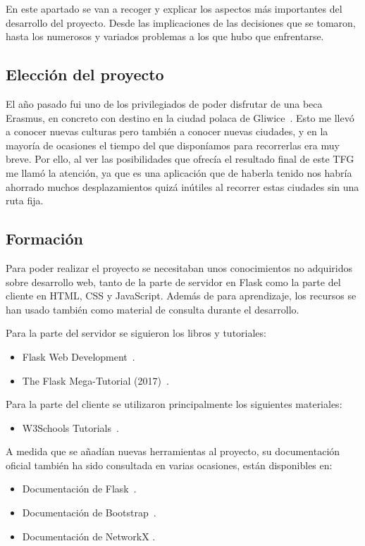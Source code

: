 
En este apartado se van a recoger y explicar los aspectos más importantes del desarrollo del proyecto. Desde las implicaciones de las decisiones que se tomaron, hasta los numerosos y variados problemas a los que hubo que enfrentarse.

\subsection{Elección del proyecto}

El año pasado fui uno de los privilegiados de poder disfrutar de una beca Erasmus, en concreto con destino en la ciudad polaca de Gliwice~\cite{wiki:gliwice}.
Esto me llevó a conocer nuevas culturas pero también a conocer nuevas ciudades, y en la mayoría de ocasiones el tiempo del que disponíamos para recorrerlas era muy breve. Por ello, al ver las posibilidades que ofrecía el resultado final de este TFG me llamó la atención, ya que es una aplicación que de haberla tenido nos habría ahorrado muchos desplazamientos quizá inútiles al recorrer estas ciudades sin una ruta fija.

\subsection{Formación}

Para poder realizar el proyecto se necesitaban unos conocimientos no adquiridos sobre desarrollo web, tanto de la parte de servidor en Flask como la parte del cliente en HTML, CSS y JavaScript. Además de para aprendizaje, los recursos se han usado también como material de consulta durante el desarrollo.

Para la parte del servidor se siguieron los libros y tutoriales:
\begin{itemize}
	\item Flask Web Development~\cite{grinberg2014flask}.
	\item The Flask Mega-Tutorial (2017)~\cite{grinberg-mega}.
\end{itemize}

Para la parte del cliente se utilizaron principalmente los siguientes
materiales:
\begin{itemize}
	\item W3Schools Tutorials~\cite{w3schools}.
\end{itemize}

A medida que se añadían nuevas herramientas al proyecto, su documentación
oficial también ha sido consultada en varias ocasiones, están disponibles en:
\begin{itemize}
	\item Documentación de Flask~\cite{doc:flask}.
	\item Documentación de Bootstrap~\cite{doc:bootstrap}.
	\item Documentación de NetworkX \cite{SciPyProceedings_11}.
\end{itemize}

